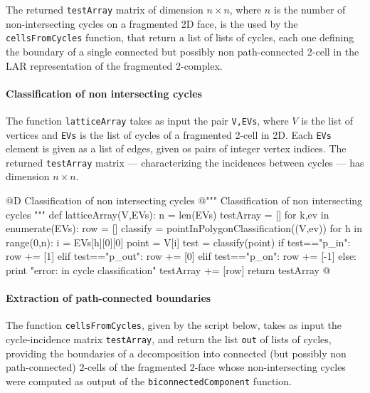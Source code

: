 \documentclass[11pt,oneside]{article}    %
\begin{document}
The returned \texttt{testArray} matrix of dimension $n\times n$, where $n$ is the number of non-intersecting cycles on a fragmented 2D face, is the used by the \texttt{cellsFromCycles} function, that return a list of lists of cycles, each one defining the boundary of a single connected but possibly non path-connected 2-cell in the LAR representation of the fragmented 2-complex. 

\paragraph{Classification of non intersecting cycles}

The function \texttt{latticeArray} takes as input the pair \texttt{V,EVs}, where $V$ is the list of vertices and \texttt{EVs} is the list of cycles of a fragmented 2-cell in 2D. Each \texttt{EVs} element is given as a list of edges, given os pairs of integer vertex indices.
The returned \texttt{testArray} matrix --- characterizing the incidences between cycles --- has dimension $n\times n$.

@D Classification of non intersecting cycles
@{""" Classification of non intersecting cycles """
def latticeArray(V,EVs):
    n = len(EVs)
    testArray = []
    for k,ev in enumerate(EVs):
        row = []
        classify = pointInPolygonClassification((V,ev))
        for h in range(0,n):
            i = EVs[h][0][0]
            point = V[i]
            test = classify(point)
            if test=="p_in": row += [1]
            elif test=="p_out": row += [0]
            elif test=="p_on": row += [-1]
            else: print "error: in cycle classification"
        testArray += [row]
    return testArray
@}

\paragraph{Extraction of path-connected boundaries}

The function \texttt{cellsFromCycles}, given by the script below, takes as input the cycle-incidence matrix \texttt{testArray}, and return the list \texttt{out} of lists of cycles, providing the boundaries of a decomposition into connected (but possibly non path-connected) 2-cells of the fragmented 2-face whose non-intersecting cycles were computed as output of the \texttt{biconnectedComponent} function. 
\end{document}
